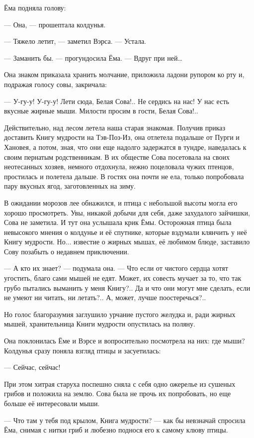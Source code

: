 \documentclass[12pt, a4paper, openany]{book}
\begin{document}
	Ёма подняла голову:
	
	— Она, — прошептала колдунья.
	
	— Тяжело летит, — заметил Вэрса. — Устала.
	
	— Заманить бы. — прогундосила Ёма. — Вдруг при ней…
	
	Она знаком приказала хранить молчание, приложила ладони рупором ко рту и, подражая голосу совы, закричала:
	
	— У-гу-у! У-гу-у! Лети сюда, Белая Сова!.. Не сердись на нас! У нас есть вкусные жирные мыши. Милости просим в гости, Белая Сова!..
	
	Действительно, над лесом летела наша старая знакомая. Получив приказ доставить Книгу мудрости на Тэв-Поз-Из, она отлетела подальше от Пурги и Хановея, а потом, зная, что они еще надолго задержатся в тундре, наведалась к своим пернатым родственникам. В их обществе Сова посетовала на своих неотесанных хозяев, немного отдохнула, нежно поцеловала чужих птенцов, простилась и полетела дальше. В гостях она почти не ела, только попробовала пару вкусных ягод, заготовленных на зиму.
	
	В ожидании морозов лее обнажился, и птица с небольшой высоты могла его хорошо просмотреть. Увы, никакой добычи для себя, даже захудалого зайчишки, Сова не заметила. И тут она услышала крик Ёмы. Осторожная птица была невысокого мнения о колдунье и её спутнике, которые вздумали клянчить у неё Книгу мудрости. Но... известие о жирных мышах, её любимом блюде, заставило Сову позабыть о недавнем приключении.
	
	— А кто их знает? — подумала она. — Что если от чистого сердца хотят угостить, благо сами мышей не едят. Может, их совесть мучает за то, что так грубо пытались выманить у меня Книгу?.. Да и что они могут мне сделать, если не умеют ни читать, ни летать?.. А, может, лучше поостеречься?..
	
	Но голос благоразумия заглушило урчание пустого желудка и, ради жирных мышей, хранительница Книги мудрости опустилась на поляну.
	
	Она поклонилась Ёме и Вэрсе и вопросительно посмотрела на них: где мыши? Колдунья сразу поняла взгляд птицы и засуетилась:
	
	— Сейчас, сейчас!
	
	При этом хитрая старуха поспешно сняла с себя одно ожерелье из сушеных грибов и положила на землю. Сова была не прочь их попробовать, но еще больше её интересовали мыши.
	
	— Что там у тебя под крылом, Книга мудрости? — как бы невзначай спросила Ёма, снимая с нитки гриб и любезно поднося его к самому клюву птицы.
	
\end{document}
